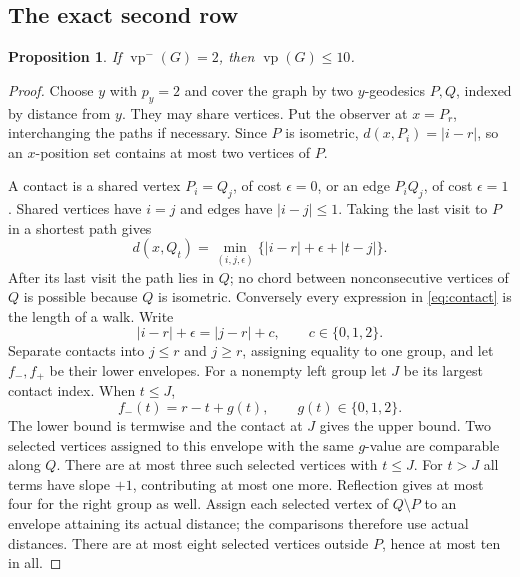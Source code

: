 \documentclass[11pt]{article}
\newtheorem{proposition}[theorem]{Proposition}
\theoremstyle{remark}\newtheorem{remark}[theorem]{Remark}
\newcommand{\vp}{\operatorname{vp}}
\newcommand{\vpm}{\operatorname{vp}^{-}}
\begin{document}
\subsection{The exact second row}
\begin{proposition}\label{prop:ten}
If $\vpm(G)=2$, then $\vp(G)\le10$.
\end{proposition}
\begin{proof}
Choose $y$ with $p_y=2$ and cover the graph by two $y$-geodesics $P,Q$,
indexed by distance from $y$. They may share vertices. Put the observer at
$x=P_r$, interchanging the paths if necessary. Since $P$ is isometric,
$d(x,P_i)=|i-r|$, so an $x$-position set contains at most two vertices of $P$.

A contact is a shared vertex $P_i=Q_j$, of cost $\epsilon=0$, or an edge
$P_iQ_j$, of cost $\epsilon=1$. Shared vertices have $i=j$ and edges have
$|i-j|\le1$. Taking the last visit to $P$ in a shortest path gives
\begin{equation}\label{eq:contact}
 d(x,Q_t)=\min_{(i,j,\epsilon)}\{|i-r|+\epsilon+|t-j|\}.
\end{equation}
After its last visit the path lies in $Q$; no chord between nonconsecutive
vertices of $Q$ is possible because $Q$ is isometric. Conversely every
expression in \eqref{eq:contact} is the length of a walk. Write
\[
 |i-r|+\epsilon=|j-r|+c,\qquad c\in\{0,1,2\}.
\]
Separate contacts into $j\le r$ and $j\ge r$, assigning equality to one
group, and let $f_-,f_+$ be their lower envelopes. For a nonempty left group
let $J$ be its largest contact index. When $t\le J$,
\[
 f_-(t)=r-t+g(t),\qquad g(t)\in\{0,1,2\}.
\]
The lower bound is termwise and the contact at $J$ gives the upper bound.
Two selected vertices assigned to this envelope with the same $g$-value
are comparable along $Q$. There are at most three such selected vertices
with $t\le J$. For $t>J$ all terms have slope $+1$, contributing at most
one more. Reflection gives at most four for the right group as well.
Assign each selected vertex of $Q\setminus P$ to an envelope attaining
its actual distance; the comparisons therefore use actual distances.
There are at most eight selected vertices outside $P$, hence at most ten
in all.
\end{proof}
\end{document}
